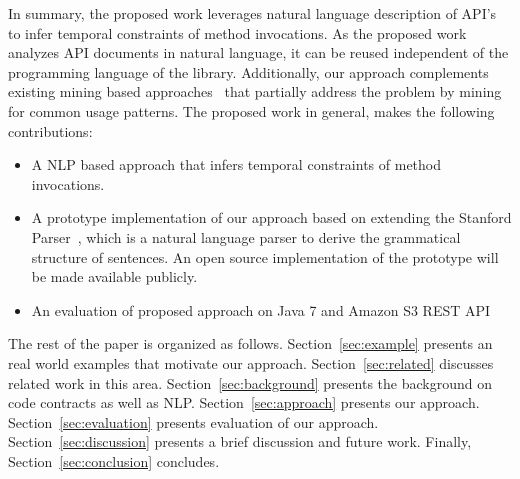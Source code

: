 
In summary, the proposed work leverages natural language description of API's to infer temporal constraints of method invocations.
As the proposed work analyzes API documents in natural language, it can be reused independent of the programming language of the library.
Additionally, our approach complements existing mining based approaches~\cite{buse2012synthesizing, thummalapenta07parseweb, Wang:2013:MSR, Zhong:2009:MMR} that partially address the problem by mining for common usage patterns.
The proposed work in general, makes the following contributions:


\begin{itemize}
	\item A NLP based approach that infers temporal constraints of method invocations.
	\item A prototype implementation of our approach based on extending the Stanford Parser~\cite{Klein03,SNLP1}, which is a natural language parser to derive the grammatical structure of sentences.
	An open source implementation of the prototype will be made available publicly. 
	\item An evaluation of proposed approach on Java 7 and Amazon S3 REST API
\end{itemize}


The rest of the paper is organized as follows.
Section~\ref{sec:example} presents an real world examples that motivate our approach.
Section~\ref{sec:related} discusses related work in this area.
Section~\ref{sec:background} presents the  background on code contracts as well as NLP.
Section~\ref{sec:approach} presents our approach.
Section~\ref{sec:evaluation} presents evaluation of our approach.
Section~\ref{sec:discussion} presents a brief discussion and future work.
Finally, Section~\ref{sec:conclusion} concludes.


